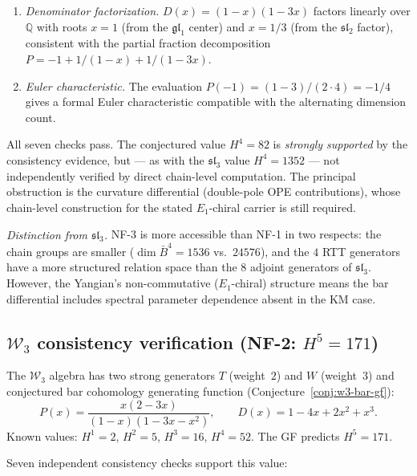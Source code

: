\begin{enumerate}[label=(\roman*)]
\item \emph{Denominator factorization.}
$D(x) = (1-x)(1-3x)$ factors linearly over $\mathbb{Q}$
with roots $x = 1$ (from the $\mathfrak{gl}_1$ center)
and $x = 1/3$ (from the $\mathfrak{sl}_2$ factor),
consistent with the partial fraction decomposition
$P = -1 + 1/(1-x) + 1/(1-3x)$.

\item \emph{Euler characteristic.}
The evaluation $P(-1) = (1-3)/(2 \cdot 4) = -1/4$ gives a
formal Euler characteristic compatible with the alternating
dimension count.
\end{enumerate}

\noindent
All seven checks pass.  The conjectured value $H^4 = 82$
is \emph{strongly supported} by the consistency evidence,
but --- as with the $\mathfrak{sl}_3$ value $H^4 = 1352$ ---
not independently verified by direct chain-level computation.
The principal obstruction is the curvature differential
(double-pole OPE contributions), whose chain-level construction for the stated $E_1$-chiral carrier is still required.

\emph{Distinction from $\widehat{\mathfrak{sl}}_3$.}
NF-3 is more accessible than NF-1 in two respects:
the chain groups are smaller ($\dim \bar{B}^4 = 1536$
vs.\ $24576$), and the $4$ RTT generators have a more
structured relation space than the $8$ adjoint generators
of $\mathfrak{sl}_3$.  However, the Yangian's non-commutative
($E_1$-chiral) structure means the bar differential includes
spectral parameter dependence absent in the KM case.


\subsection{$\mathcal{W}_3$ consistency verification (NF-2: $H^5 = 171$)}
\label{subsec:w3-h5-verification}

The $\mathcal{W}_3$ algebra has two strong generators $T$ (weight~$2$)
and $W$ (weight~$3$) and conjectured bar cohomology generating function
(Conjecture~\ref{conj:w3-bar-gf}):
\[
  P(x) = \frac{x(2 - 3x)}{(1-x)(1 - 3x - x^2)}, \qquad
  D(x) = 1 - 4x + 2x^2 + x^3.
\]
Known values: $H^1 = 2$, $H^2 = 5$, $H^3 = 16$, $H^4 = 52$.
The GF predicts $H^5 = 171$.

Seven independent consistency checks support this value:

